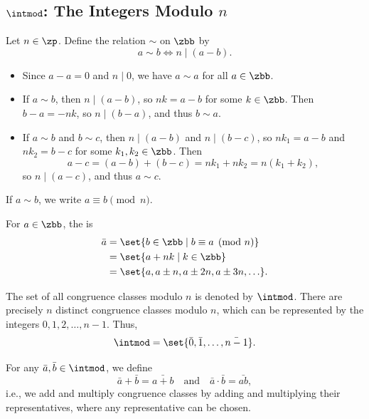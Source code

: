\subsection{\texorpdfstring{$\intmod$: The Integers Modulo $n$}{Z/nZ: The Integers Modulo n}}

\begin{note}
    Let $n \in \zp$. Define the relation $\sim$ on $\zbb$ by
    \[
        a \sim b \iff n \mid (a - b).
    \]
    \begin{itemize}
        \item Since $a - a = 0$ and $n \mid 0$, we have $a \sim a$ for all $a \in \zbb$.
        \item If $a \sim b$, then $n \mid (a - b)$, so $nk = a - b$ for some $k \in \zbb$. Then $b - a = -nk$, so $n \mid (b - a)$, and thus $b \sim a$.
        \item If $a \sim b$ and $b \sim c$, then $n \mid (a - b)$ and $n \mid (b - c)$, so $nk_1 = a - b$ and $nk_2 = b - c$ for some $k_1, k_2 \in \zbb$. Then
        \[
            a - c = (a - b) + (b - c) = nk_1 + nk_2 = n(k_1 + k_2),
        \]
        so $n \mid (a - c)$, and thus $a \sim c$.
    \end{itemize}
\end{note}

\begin{groupdef}
     If $a \sim b$, we write $a \equiv b \pmod{n}$.

     For $a \in \zbb$, the  is
    \begin{align*}
        \bar a &= \set{b \in \zbb \mid b \equiv a \pmod{n}} \\
        &= \set{a + nk \mid k \in \zbb} \\
        &= \set{a, a \pm n, a \pm 2n, a \pm 3n, \ldots}.
    \end{align*}

     The set of all congruence classes modulo $n$ is denoted by $\intmod$.
    There are precisely $n$ distinct congruence classes modulo $n$, which can be represented by the integers $0, 1, 2, \ldots, n - 1$. Thus,
    \[
        \intmod = \set{\bar 0, \bar 1, \ldots, \bar{n - 1}}.
    \]

     For any $\bar a, \bar b \in \intmod$, we define
    \[
        \bar a + \bar b = \bar{a + b} \quad \text{and} \quad \bar a \cdot \bar b = \bar{ab},
    \]
    i.e., we add and multiply congruence classes by adding and multiplying their representatives, where any representative can be chosen.
\end{groupdef}

